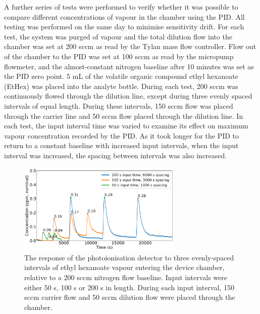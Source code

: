 \documentclass[
  a4paper,
]{scrbook}
\begin{document}
A further series of tests were performed to verify whether it was
possible to compare different concentrations of vapour in the chamber
using the PID. All testing was performed on the same day to minimise
sensitivity drift. For each test, the system was purged of vapour and
the total dilution flow into the chamber was set at 200 sccm as read by
the Tylan mass flow controller. Flow out of the chamber to the PID was
set at 100 sccm as read by the micropump flowmeter, and the
almost-constant nitrogen baseline after 10 minutes was set as the PID
zero point. 5 mL of the volatile organic compound ethyl hexanoate
(EtHex) was placed into the analyte bottle. During each test, 200 sccm
was continuously flowed through the dilution line, except during three
evenly spaced intervals of equal length. During these intervals, 150
sccm flow was placed through the carrier line and 50 sccm flow placed
through the dilution line. In each test, the input interval time was
varied to examine its effect on maximum vapour concentration recorded by
the PID. As it took longer for the PID to return to a constant baseline
with increased input intervals, when the input interval was increased,
the spacing between intervals was also increased.

\begin{figure}

{\centering \includegraphics[width=0.7\textwidth,height=\textheight]{figures/ch9/input_time_comparison_PID.png}

}

\caption{\label{fig-concentration-comparison}The response of the
photoionisation detector to three evenly-spaced intervals of ethyl
hexanoate vapour entering the device chamber, relative to a 200 sccm
nitrogen flow baseline. Input intervals were either 50 s, 100 s or 200 s
in length. During each input interval, 150 sccm carrier flow and 50 sccm
dilution flow were placed through the chamber.}

\end{figure}
\end{document}
